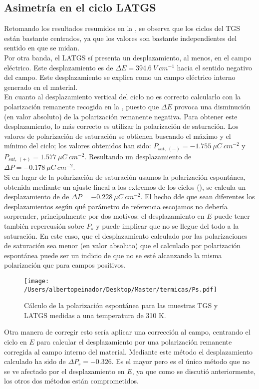 \documentclass[a4paper, 12pt, spanish]{article}
\begin{document}
\begin{multicols}{2}
\subsection*{Asimetría en el ciclo LATGS}
Retomando los resultados resumidos en la , se observa que los ciclos del TGS están bastante centrados, ya que los valores son bastante independientes del sentido en que se midan.\\
Por otra banda, el LATGS sí presenta un desplazamiento, al menos, en el campo eléctrico. Este desplazamiento es de $\Delta E = 394.6\ V\ cm^{-1}$ hacia el sentido negativo del campo. Este desplazamiento se explica como un campo eléctrico interno generado en el material.\\
En cuanto al desplazamiento vertical del ciclo no es correcto calcularlo con la polarización remanente recogida en la , puesto que $\Delta E$ provoca una disminución (en valor absoluto) de la polarización remanente negativa. Para obtener este desplazamiento, lo más correcto es utilizar la polarización de saturación. Los valores de polarización de saturación se obtienen buscando el máximo y el mínimo del ciclo; los valores obtenidos han sido: $P_{sat,\ (-)} = -1.755\ \mu C\ cm^{-2}$ y $P_{sat,\ (+)} = 1.577\ \mu C\ cm^{-2}$. Resultando un desplazamiento de $\Delta P = -0.178\ \mu C\ cm^{-2}$.\\
Si en lugar de la polarización de saturación usamos la polarización espontánea, obtenida mediante un ajuste lineal a los extremos de los ciclos (), se calcula un desplazamiento de de $\Delta P = -0.228\ \mu C\ cm^{-2}$. El hecho dde que sean diferentes los desplazamientos según qué parámetro de referencia escojamos no debería sorprender, principalmente por dos motivos: el desplazamiento en $E$ puede tener también repercusión sobre $P_s$ y puede implicar que no se llegue del todo a la saturación. En este caso, que el desplazamiento calculado por las polarizaciones de saturación sea menor (en valor absoluto) que el calculado por polarización espontánea puede ser un indicio de que no se esté alcanzando la misma polarización que para campos positivos.
\begin{figure}[H]
    \centering
    \texttt{[image: /Users/albertopeinador/Desktop/Master/termicas/Ps.pdf]}
    \caption{Cálculo de la polarización espontánea para las muestras TGS y LATGS medidas a una temperatura de 310 K.}\label{fig:P_s}
\end{figure}
Otra manera de corregir esto sería aplicar una corrección al campo, centrando el ciclo en $E$ para calcular el desplazamiento por una polarización remanente corregida al campo interno del material. Mediante este método el desplazamiento calculado ha sido de $\Delta P_r = -0.326$. Es el mayor pero es el único método que no se ve afectado por el desplazamiento en $E$, ya que como se discutió anteriormente, los otros dos métodos están comprometidos.

\end{multicols}
\end{document}
